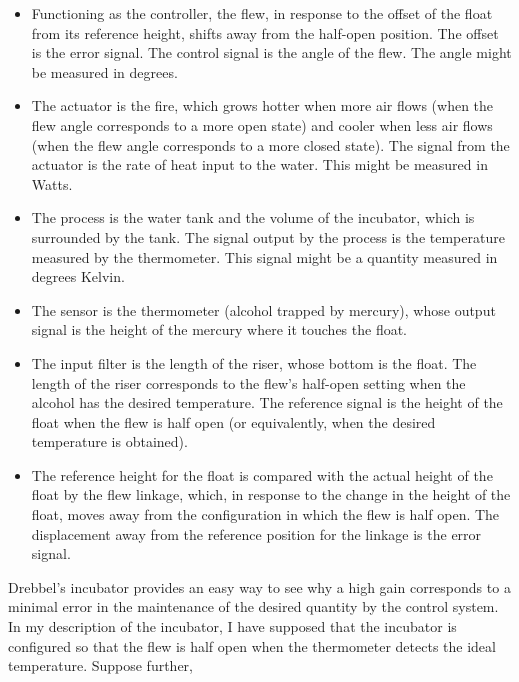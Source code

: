 \begin{enumerate}[(a)]
\begin{itemize}
         \item Functioning as the controller, the flew, in response to the
            offset of the float from its reference height, shifts away from the
            half-open position. The offset is the error signal.  The control
            signal is the angle of the flew. The angle might be measured in
            degrees.
         \item The actuator is the fire, which grows hotter when more air flows
            (when the flew angle corresponds to a more open state) and cooler
            when less air flows (when the flew angle corresponds to a more
            closed state).  The signal from the actuator is the rate of heat
            input to the water. This might be measured in Watts.
         \item The process is the water tank and the volume of the incubator,
            which is surrounded by the tank. The signal output by the process
            is the temperature measured by the thermometer. This signal might
            be a quantity measured in degrees Kelvin.
         \item The sensor is the thermometer (alcohol trapped by mercury),
            whose output signal is the height of the mercury where it touches
            the float.
         \item The input filter is the length of the riser, whose bottom is the
            float. The length of the riser corresponds to the flew's half-open
            setting when the alcohol has the desired temperature.  The
            reference signal is the height of the float when the flew is half
            open (or equivalently, when the desired temperature is obtained).
         \item The reference height for the float is compared with the actual
            height of the float by the flew linkage, which, in response to the
            change in the height of the float, moves away from the
            configuration in which the flew is half open. The displacement away
            from the reference position for the linkage is the error signal.
      \end{itemize}
      Drebbel's incubator provides an easy way to see why a high gain
      corresponds to a minimal error in the maintenance of the desired quantity
      by the control system. In my description of the incubator, I have
      supposed that the incubator is configured so that the flew is half open
      when the thermometer detects the ideal temperature. Suppose further,

\end{enumerate}
